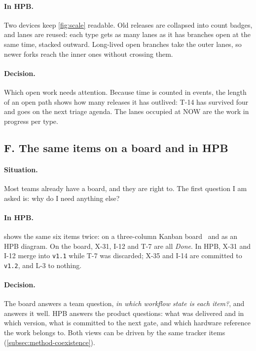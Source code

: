 \paragraph{In HPB.}
Two devices keep \cref{fig:scale} readable. Old releases are collapsed
into count badges, and lanes are reused: each type gets as many lanes as
it has branches open at the same time, stacked outward. Long-lived open
branches take the outer lanes, so newer forks reach the inner ones without
crossing them.

\paragraph{Decision.}
Which open work needs attention. Because time is counted in events, the
length of an open path shows how many releases it has outlived: T-14 has
survived four and goes on the next triage agenda. The lanes occupied at
NOW are the work in progress per type.

\subsection{F. The same items on a board and in HPB}
\label{sec:cond-board}



\paragraph{Situation.}
Most teams already have a board, and they are right to. The first
question I am asked is: why do I need anything else?

\paragraph{In HPB.}
 shows the same six items twice: on a three-column
Kanban board~\citep{anderson2010kanban} and as an HPB diagram. On the
board, X-31, I-12 and T-7 are all \emph{Done}. In HPB, X-31 and I-12 merge
into \texttt{v1.1} while T-7 was discarded; X-35 and I-14 are committed to
\texttt{v1.2}, and L-3 to nothing.

\paragraph{Decision.}
The board answers a team question, \emph{in which workflow state is each
item?}, and answers it well. HPB answers the product questions: what was
delivered and in which version, what is committed to the next gate, and
which hardware reference the work belongs to. Both views can be driven by
the same tracker items (\cref{subsec:method-coexistence}).

